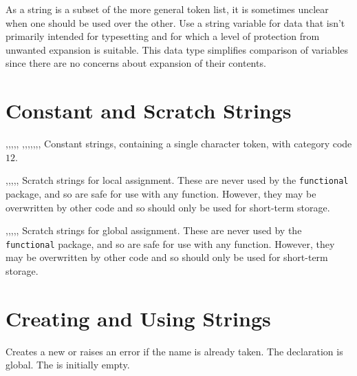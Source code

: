 \documentclass[oneside]{book}
\begin{document}
As a string is a subset of the more general token list, it is sometimes unclear
when one should be used over the other.
Use a string variable for data that isn't primarily intended for typesetting
and for which a level of protection from unwanted expansion is suitable.
This data type simplifies comparison of variables since there are no concerns
about expansion of their contents.


\section{Constant and Scratch Strings}

\begin{variable}{\cAmpersandStr,\cAtsignStr,\cBackslashStr,\cLeftBraceStr,\cRightBraceStr,
\cCircumflexStr,\cColonStr,\cDollarStr,\cHashStr,\cPercentStr,\cTildeStr,\cUnderscoreStr,\cZeroStr}
Constant strings, containing a single character token, with category code $12$.
\end{variable}

\begin{variable}{\lTmpaStr,\lTmpbStr,\lTmpcStr,\lTmpiStr,\lTmpjStr,\lTmpkStr}
Scratch strings for local assignment. These are never used by
the \verb!functional! package, and so are safe for use with any
function. However, they may be overwritten by other
code and so should only be used for short-term storage.
\end{variable}

\begin{variable}{\gTmpaStr,\gTmpbStr,\gTmpcStr,\gTmpiStr,\gTmpjStr,\gTmpkStr}
Scratch strings for global assignment. These are never used by
the \verb!functional! package, and so are safe for use with any
function. However, they may be overwritten by other
code and so should only be used for short-term storage.
\end{variable}

\section{Creating and Using Strings}

\begin{function}{\strNew}
\begin{syntax}
 
\end{syntax}
Creates a new  or raises an error if the name is
already taken. The declaration is global. The  is
initially empty.
\begin{codehigh}
\strNew \lFooSomeStr
\end{codehigh}
\end{function}
\end{document}
